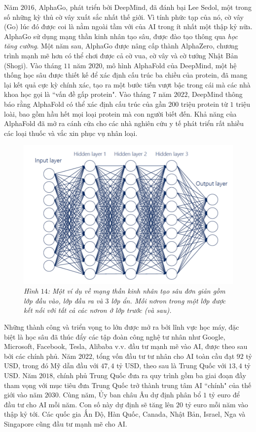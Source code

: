 \begin{multicols}{2}
	\vskip 0.1cm
	Năm $2016$, AlphaGo, phát triển bởi DeepMind, đã đánh bại Lee Sedol, một trong số những kỳ thủ cờ vây xuất sắc nhất thế giới. Vì tính phức tạp của nó, cờ vây (Go) lúc đó được coi là nằm ngoài tầm với của AI trong ít nhất một thập kỷ nữa. AlphaGo sử dụng mạng thần kinh nhân tạo sâu, được đào tạo thông qua \textit{học tăng cường}. Một năm sau, AlphaGo được nâng cấp thành AlphaZero, chương trình mạnh mẽ hơn có thể chơi được cả cờ vua, cờ vây và cờ tướng Nhật Bản (Shogi).
	\vskip 0.1cm
	Vào tháng $11$ năm $2020$, mô hình AlphaFold của DeepMind, một hệ thống học sâu được thiết kế để xác định cấu trúc ba chiều của protein, đã mang lại kết quả cực kỳ chính xác, tạo ra một bước tiến vượt bậc trong cái mà các nhà khoa học gọi là ``vấn đề gấp protein". Vào tháng $7$ năm $2022$, DeepMind thông báo rằng AlphaFold có thể xác định cấu trúc của gần $200$ triệu protein từ $1$ triệu loài, bao gồm hầu hết mọi loại protein mà con người biết đến. Khả năng của AlphaFold đã mở ra cánh cửa cho các nhà nghiên cứu y tế phát triển rất nhiều các loại thuốc và vắc xin phục vụ nhân loại.
	\begin{figure}[H]
		\vspace*{-5pt}
		\centering
		\captionsetup{labelformat= empty, justification=centering}
		\includegraphics[width= 1\linewidth]{Deep-Neural-Network.png}
		\caption{\small\textit{\color{cackithi}Hình $14$: Một ví dụ về mạng thần kinh nhân tạo sâu đơn giản gồm lớp đầu vào, lớp đầu ra và $3$ lớp ẩn. Mỗi nơron trong một lớp được kết nối với tất cả các nơron ở lớp trước (và sau).}}
		\vspace*{-10pt}
	\end{figure}
	Những thành công và triển vọng to lớn được mở ra bởi lĩnh vực học máy, đặc biệt là học sâu đã thúc đẩy các tập đoàn công nghệ tư nhân như Google, Microsoft, Facebook, Tesla, Alibaba v.v. đầu tư mạnh mẽ vào AI, được theo sau bởi các chính phủ. Năm $2022$, tổng vốn đầu tư tư nhân cho AI toàn cầu đạt $92$ tỷ USD, trong đó Mỹ dẫn đầu với $47{,}4$ tỷ USD, theo sau là Trung Quốc với $13{,}4$ tỷ USD. Năm $2018$, chính phủ Trung Quốc đưa ra quy trình gồm ba giai đoạn đầy tham vọng với mục tiêu đưa Trung Quốc trở thành trung tâm AI ``chính" của thế giới vào năm $2030$. Cùng năm, Ủy ban châu Âu dự định phân bổ $1$ tỷ euro để đầu tư cho AI mỗi năm. Con số này dự định sẽ tăng lên $20$ tỷ euro mỗi năm vào thập kỷ tới. Các quốc gia Ấn Độ, Hàn Quốc, Canada, Nhật Bản, Israel, Nga và Singapore cũng đầu tư mạnh mẽ cho AI.

\end{multicols}
